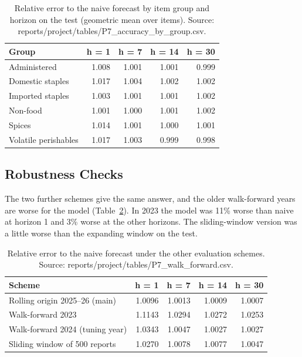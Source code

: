 \documentclass[12pt]{report}
\begin{document}
\begin{table}[H]\centering\small
\caption{Relative error to the naive forecast by item group and horizon on the test (geometric mean over items). Source: reports/project/tables/P7\_accuracy\_by\_group.csv.}\label{tab:group}
\begin{tabular}{|l|r|r|r|r|}
\hline
\textbf{Group} & \textbf{h = 1} & \textbf{h = 7} & \textbf{h = 14} & \textbf{h = 30} \\
\hline
Administered & 1.008 & 1.001 & 1.001 & 0.999 \\
\hline
Domestic staples & 1.017 & 1.004 & 1.002 & 1.002 \\
\hline
Imported staples & 1.003 & 1.001 & 1.001 & 1.002 \\
\hline
Non-food & 1.001 & 1.000 & 1.001 & 1.002 \\
\hline
Spices & 1.014 & 1.001 & 1.000 & 1.001 \\
\hline
Volatile perishables & 1.017 & 1.003 & 0.999 & 0.998 \\
\hline
\end{tabular}
\end{table}

\subsection{Robustness Checks}
The two further schemes give the same answer, and the older walk-forward years are worse for the model (Table~\ref{tab:wf}). In 2023 the model was 11\% worse than naive at horizon 1 and 3\% worse at the other horizons. The sliding-window version was a little worse than the expanding window on the test.

\begin{table}[H]\centering\small
\caption{Relative error to the naive forecast under the other evaluation schemes. Source: reports/project/tables/P7\_walk\_forward.csv.}\label{tab:wf}
\begin{tabular}{|l|r|r|r|r|}
\hline
\textbf{Scheme} & \textbf{h = 1} & \textbf{h = 7} & \textbf{h = 14} & \textbf{h = 30} \\
\hline
Rolling origin 2025--26 (main) & 1.0096 & 1.0013 & 1.0009 & 1.0007 \\
\hline
Walk-forward 2023 & 1.1143 & 1.0294 & 1.0272 & 1.0253 \\
\hline
Walk-forward 2024 (tuning year) & 1.0343 & 1.0047 & 1.0027 & 1.0027 \\
\hline
Sliding window of 500 reports & 1.0270 & 1.0078 & 1.0077 & 1.0047 \\
\hline
\end{tabular}
\end{table}
\end{document}
